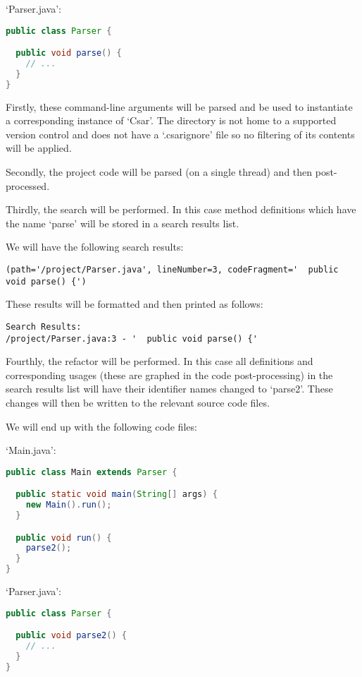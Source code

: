 \documentclass[12pt, letterpaper]{article}
\begin{document}
`Parser.java':
\begin{lstlisting}[language=Java]
public class Parser {

  public void parse() {
    // ...
  }
}
\end{lstlisting}

Firstly, these command-line arguments will be parsed and be used to instantiate a corresponding instance of `Csar'. The directory is not home to a supported version control and does not have a `.csarignore' file so no filtering of its contents will be applied.

Secondly, the project code will be parsed (on a single thread) and then post-processed.

Thirdly, the search will be performed. In this case method definitions which have the name `parse' will be stored in a search results list.

We will have the following search results:
\begin{lstlisting}
(path='/project/Parser.java', lineNumber=3, codeFragment='  public void parse() {')
\end{lstlisting}

These results will be formatted and then printed as follows:
\begin{lstlisting}
Search Results:
/project/Parser.java:3 - '  public void parse() {'
\end{lstlisting}

Fourthly, the refactor will be performed. In this case all definitions and corresponding usages (these are graphed in the code post-processing) in the search results list will have their identifier names changed to `parse2'.
These changes will then be written to the relevant source code files.

We will end up with the following code files:

`Main.java':
\begin{lstlisting}[language=Java]
public class Main extends Parser {

  public static void main(String[] args) {
    new Main().run();
  }

  public void run() {
    parse2();
  }
}
\end{lstlisting}

`Parser.java':
\begin{lstlisting}[language=Java]
public class Parser {

  public void parse2() {
    // ...
  }
}
\end{lstlisting}
\end{document}
